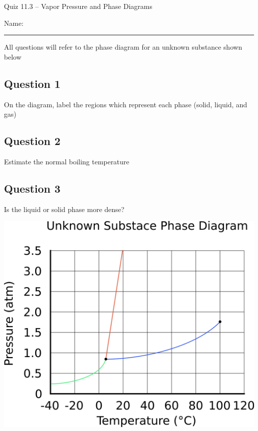 \documentclass[11pt, letterpaper]{memoir}
\begin{document}
	\begin{center}
		{\large	Quiz 11.3 -- Vapor Pressure and Phase Diagrams}
	\end{center}
	{\large Name: \rule[-1mm]{4in}{.1pt} 
	
	\begin{center}	
	All questions will refer to the phase diagram for an unknown substance shown below
	\end{center}
	
	\noindent
	\begin{minipage}[T]{0.49\textwidth}
		\subsection*{Question 1}
		On the diagram, label the regions which represent each phase (solid, liquid, and gas)
		
		\subsection*{Question 2}
		Estimate the normal boiling temperature
		
		\hspace{1em}
		\subsection*{Question 3}
		Is the liquid or solid phase more dense?
		
	\end{minipage} \hspace{1em}
	\begin{minipage}[T]{0.49\textwidth}
		\includegraphics[width=\textwidth]{Phase_Diagram}
	\end{minipage}

}
\end{document}
